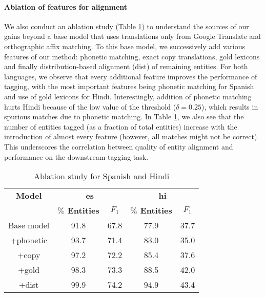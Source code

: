 \documentclass[11pt,a4paper]{article}
\begin{document}
\paragraph{Ablation of features for alignment}
We also conduct an ablation study (Table \ref{tab:ablation}) 
to understand the sources of our gains beyond a base model 
that uses translations only from Google Translate and orthographic affix matching. 
To this base model, we successively add various features of our method: 
phonetic matching, exact copy translations, gold lexicons
and finally distribution-based alignment (dist) of remaining entities. 
For both languages, we observe that every additional feature 
improves the performance of tagging, with the most important features 
being phonetic matching for Spanish and use of gold lexicons for Hindi. 
Interestingly, addition of phonetic matching hurts Hindi because of the low value of the threshold ($\delta=0.25$), which results in spurious matches due to phonetic matching. 
In Table \ref{tab:ablation}, we also see that the number of entities tagged
(as a fraction of total entities) increase with the introduction of almost every feature 
(however, all matches might not be correct). 
This underscores the correlation between quality of entity alignment 
and performance on the downstream tagging task. 


\begin{table}[htb]
\small
\centering
\begin{tabularx}{220pt}{ccccc}
\toprule
\bf Model & \multicolumn{2}{c}{\bf es} & \multicolumn{2}{c}{\bf hi} \\
 & \bf $\%$ Entities & \bf $F_1$  & \bf $\%$ Entities & \bf $F_1$ \\
\midrule
Base model & 91.8 & 67.8 & 77.9 & 37.7 \\
\hspace{8pt}+phonetic & 93.7 & 71.4 & 83.0 & 35.0 \\
\hspace{8pt}+copy & 97.2 & 72.2 & 85.4 & 37.6 \\
\hspace{8pt}+gold & 98.3 & 73.3 & 88.5 & 42.0 \\
\hspace{8pt}+dist & 99.9 & 74.2 & 94.9 & 43.4 \\
\bottomrule
\end{tabularx}
\caption{Ablation study for Spanish and Hindi}
\label{tab:ablation}
\end{table}
\end{document}
